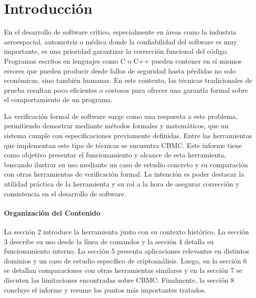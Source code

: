 \documentclass[runningheads]{llncs}
\begin{document}
%
\section{Introducción}
En el desarrollo de software crítico, especialmente en áreas como la industria aeroespacial, automotriz o médica donde la confiabilidad del software es muy importante,
es una prioridad garantizar la corrección funcional del código.
Programas escritos en lenguajes como C o C++ pueden contener en sí mismos errores que pueden producir desde fallos de seguridad hasta pérdidas no solo económicas,
sino también humanas.
En este contexto, las técnicas tradicionales de prueba resultan poco eficientes o costosas para ofrecer una garantía formal sobre el comportamiento de un programa.

La verificación formal de software surge como una respuesta a este problema, permitiendo demostrar mediante métodos formales y matemáticos,
que un sistema cumple con especificaciones previamente definidas.
Entre las herramientas que implementan este tipo de técnicas se encuentra CBMC.
Este informe tiene como objetivo presentar el funcionamiento y alcance de esta herramienta, buscando ilustrar su uso mediante un caso de estudio concreto y su comparación con otras
herramientas de verificación formal.
La intención es poder destacar la utilidad práctica de la herramienta y su rol a la hora de asegurar corrección y consistencia en el desarrollo de software.

\paragraph{Organización del Contenido}
La sección 2 introduce la herramienta junto con su contexto histórico.
La sección 3 describe su uso desde la línea de comandos y la sección 4 detalla su funcionamiento interno.
La sección 5 presenta aplicaciones relevantes en distintos dominios y un caso de estudio específico de criptoanálisis.
Luego, en la sección 6 se detallan comparaciones con otras herramientas similares y en la sección 7 se discuten las limitaciones encontradas sobre CBMC.
Finalmente, la sección 8 concluye el informe y resume los puntos más importantes tratados.

%
\end{document}
